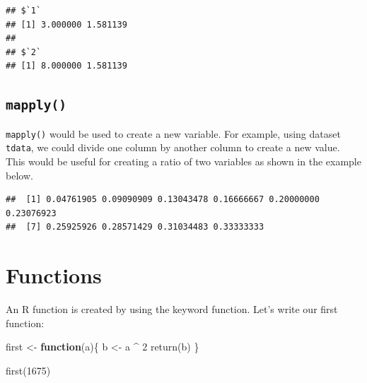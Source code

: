 \documentclass[
]{book}
\newenvironment{Shaded}{\begin{snugshade}}{\end{snugshade}}
\newcommand{\ControlFlowTok}[1]{\textcolor[rgb]{0.13,0.29,0.53}{\textbf{#1}}}
\newcommand{\DecValTok}[1]{\textcolor[rgb]{0.00,0.00,0.81}{#1}}
\newcommand{\FunctionTok}[1]{\textcolor[rgb]{0.00,0.00,0.00}{#1}}
\newcommand{\NormalTok}[1]{#1}
\newcommand{\OtherTok}[1]{\textcolor[rgb]{0.56,0.35,0.01}{#1}}
\newcommand{\SpecialCharTok}[1]{\textcolor[rgb]{0.00,0.00,0.00}{#1}}
\theoremstyle{definition}
\theoremstyle{definition}
\theoremstyle{definition}
\theoremstyle{definition}
\theoremstyle{remark}
\begin{document}
\begin{verbatim}
## $`1`
## [1] 3.000000 1.581139
## 
## $`2`
## [1] 8.000000 1.581139
\end{verbatim}

\hypertarget{mapply}{%
\subsection{\texorpdfstring{\texttt{mapply()}}{mapply()}}\label{mapply}}

\texttt{mapply()} would be used to create a new variable. For example, using dataset \texttt{tdata}, we could divide one column by another column to create a new value. This would be useful for creating a ratio of two variables as shown in the example below.

\begin{Shaded}
\end{Shaded}

\begin{verbatim}
##  [1] 0.04761905 0.09090909 0.13043478 0.16666667 0.20000000 0.23076923
##  [7] 0.25925926 0.28571429 0.31034483 0.33333333
\end{verbatim}

\hypertarget{functions}{%
\section{Functions}\label{functions}}

An R function is created by using the keyword function. Let's write our first function:

\begin{Shaded}
\begin{Highlighting}[]
\NormalTok{first }\OtherTok{\textless{}{-}} \ControlFlowTok{function}\NormalTok{(a)\{}
\NormalTok{  b }\OtherTok{\textless{}{-}}\NormalTok{ a }\SpecialCharTok{\^{}} \DecValTok{2}
  \FunctionTok{return}\NormalTok{(b)}
\NormalTok{\}}

\FunctionTok{first}\NormalTok{(}\DecValTok{1675}\NormalTok{)}
\end{Highlighting}
\end{Shaded}
\end{document}
